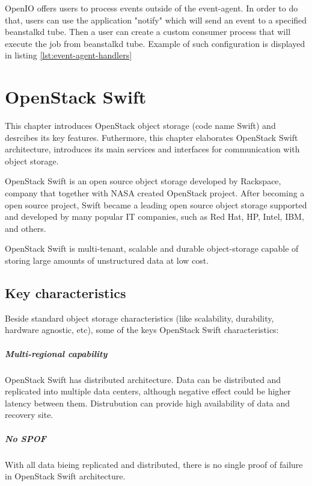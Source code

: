     OpenIO offers users to process events outside of the event-agent. In order to do that, users can use the application "notify" which will send an event to a specified beanstalkd tube. Then a user can create a custom consumer process that will execute the job from beanstalkd tube. Example of such configuration is displayed in listing \ref{lst:event-agent-handlers}

\chapter{OpenStack Swift}
    This chapter introduces OpenStack object storage (code name Swift) and desrcibes its key features. Futhermore, this chapter elaborates OpenStack Swift architecture, introduces its main services and interfaces for communication with object storage.

    OpenStack Swift is an open source object storage developed by Rackspace, company that together with NASA created OpenStack project. After becoming a open source project, Swift became a leading open source object storage supported and developed by many popular IT companies, such as Red Hat, HP, Intel, IBM, and others.

    OpenStack Swift is multi-tenant, scalable and durable object-storage capable of storing large amounts of unstructured data at low cost\cite{swiftOpenStackSwift}.

    \section{Key characteristics}
    Beside standard object storage characteristics (like scalability, durability, hardware agnostic, etc), some of the keys OpenStack Swift characteristics:

    \paragraph{Multi-regional capability}
    OpenStack Swift has distributed architecture. Data can be distributed and replicated into multiple data centers, although negative effect could be higher latency between them. Distrubution can provide high availability of data and recovery site\cite{swiftOpenStackSwift}.

    \paragraph{No SPOF}
    With all data bieing replicated and distributed, there is no single proof of failure in OpenStack Swift architecture.

